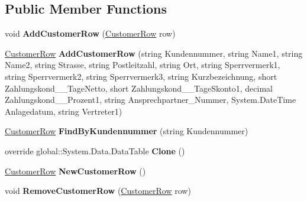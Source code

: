 \subsection*{Public Member Functions}
\begin{DoxyCompactItemize}
\item 
void {\bfseries Add\+Customer\+Row} (\hyperlink{class_products_1_1_data_1_1ds_sage_1_1_customer_row}{Customer\+Row} row)\hypertarget{class_products_1_1_data_1_1ds_sage_1_1_customer_data_table_a8b58ca24b998772ec5369242804bb2a8}{}\label{class_products_1_1_data_1_1ds_sage_1_1_customer_data_table_a8b58ca24b998772ec5369242804bb2a8}

\item 
\hyperlink{class_products_1_1_data_1_1ds_sage_1_1_customer_row}{Customer\+Row} {\bfseries Add\+Customer\+Row} (string Kundennummer, string Name1, string Name2, string Strasse, string Postleitzahl, string Ort, string Sperrvermerk1, string Sperrvermerk2, string Sperrvermerk3, string Kurzbezeichnung, short Zahlungskond\+\_\+\_\+\+Tage\+Netto, short Zahlungskond\+\_\+\_\+\+Tage\+Skonto1, decimal Zahlungskond\+\_\+\_\+\+Prozent1, string Ansprechpartner\+\_\+\+Nummer, System.\+Date\+Time Anlagedatum, string Vertreter1)\hypertarget{class_products_1_1_data_1_1ds_sage_1_1_customer_data_table_aea727dfe5eecf601c72848fc698b3eb1}{}\label{class_products_1_1_data_1_1ds_sage_1_1_customer_data_table_aea727dfe5eecf601c72848fc698b3eb1}

\item 
\hyperlink{class_products_1_1_data_1_1ds_sage_1_1_customer_row}{Customer\+Row} {\bfseries Find\+By\+Kundennummer} (string Kundennummer)\hypertarget{class_products_1_1_data_1_1ds_sage_1_1_customer_data_table_adc43389df2a684d6a1881539b733a2f3}{}\label{class_products_1_1_data_1_1ds_sage_1_1_customer_data_table_adc43389df2a684d6a1881539b733a2f3}

\item 
override global\+::\+System.\+Data.\+Data\+Table {\bfseries Clone} ()\hypertarget{class_products_1_1_data_1_1ds_sage_1_1_customer_data_table_a333d40a8221c046006c3b70090e9d3c0}{}\label{class_products_1_1_data_1_1ds_sage_1_1_customer_data_table_a333d40a8221c046006c3b70090e9d3c0}

\item 
\hyperlink{class_products_1_1_data_1_1ds_sage_1_1_customer_row}{Customer\+Row} {\bfseries New\+Customer\+Row} ()\hypertarget{class_products_1_1_data_1_1ds_sage_1_1_customer_data_table_a0bf16c2700f6d0d3f7d18ef529091a6a}{}\label{class_products_1_1_data_1_1ds_sage_1_1_customer_data_table_a0bf16c2700f6d0d3f7d18ef529091a6a}

\item 
void {\bfseries Remove\+Customer\+Row} (\hyperlink{class_products_1_1_data_1_1ds_sage_1_1_customer_row}{Customer\+Row} row)\hypertarget{class_products_1_1_data_1_1ds_sage_1_1_customer_data_table_a74e48ce7de406d5398031f80d82c400f}{}\label{class_products_1_1_data_1_1ds_sage_1_1_customer_data_table_a74e48ce7de406d5398031f80d82c400f}

\end{DoxyCompactItemize}

